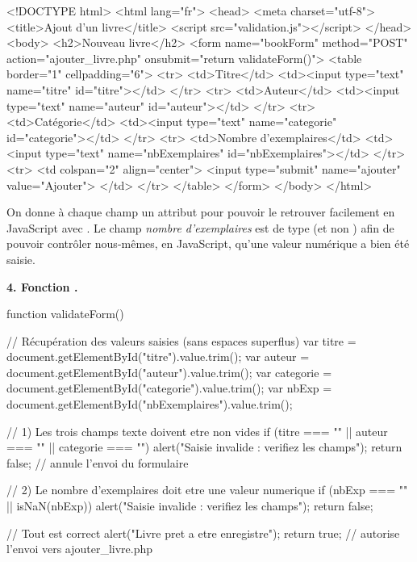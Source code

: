 \begin{codehtml}
<!DOCTYPE html>
<html lang="fr">
<head>
  <meta charset="utf-8">
  <title>Ajout d'un livre</title>
  <script src="validation.js"></script>
</head>
<body>
  <h2>Nouveau livre</h2>
  <form name="bookForm" method="POST" action="ajouter_livre.php"
        onsubmit="return validateForm()">
    <table border="1" cellpadding="6">
      <tr>
        <td>Titre</td>
        <td><input type="text" name="titre" id="titre"></td>
      </tr>
      <tr>
        <td>Auteur</td>
        <td><input type="text" name="auteur" id="auteur"></td>
      </tr>
      <tr>
        <td>Catégorie</td>
        <td><input type="text" name="categorie" id="categorie"></td>
      </tr>
      <tr>
        <td>Nombre d'exemplaires</td>
        <td><input type="text" name="nbExemplaires" id="nbExemplaires"></td>
      </tr>
      <tr>
        <td colspan="2" align="center">
          <input type="submit" name="ajouter" value="Ajouter">
        </td>
      </tr>
    </table>
  </form>
</body>
</html>
\end{codehtml}


\begin{remarque}
On donne à chaque champ un attribut  pour pouvoir le retrouver facilement
en JavaScript avec . Le champ
\emph{nombre d'exemplaires} est de type  (et non ) afin de
pouvoir contrôler nous-mêmes, en JavaScript, qu'une valeur numérique a bien été
saisie.
\end{remarque}

\medskip
\textbf{4. Fonction .}

\begin{codejs}
function validateForm() {
  // Récupération des valeurs saisies (sans espaces superflus)
  var titre  = document.getElementById("titre").value.trim();
  var auteur = document.getElementById("auteur").value.trim();
  var categorie = document.getElementById("categorie").value.trim();
  var nbExp  = document.getElementById("nbExemplaires").value.trim();

  // 1) Les trois champs texte doivent etre non vides
  if (titre === "" || auteur === "" || categorie === "") {
    alert("Saisie invalide : verifiez les champs");
    return false;   // annule l'envoi du formulaire
  }

  // 2) Le nombre d'exemplaires doit etre une valeur numerique
  if (nbExp === "" || isNaN(nbExp)) {
    alert("Saisie invalide : verifiez les champs");
    return false;
  }

  // Tout est correct
  alert("Livre pret a etre enregistre");
  return true;    // autorise l'envoi vers ajouter_livre.php
}
\end{codejs}

